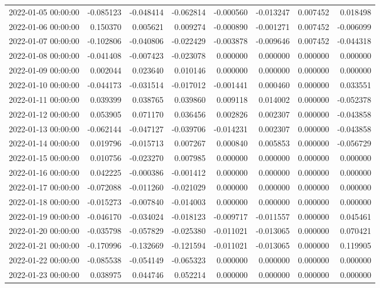 \begin{tabular}{lrrrrrrr}
2022-01-05 00:00:00 & -0.085123 & -0.048414 & -0.062814 & -0.000560 & -0.013247 & 0.007452 & 0.018498 \\
2022-01-06 00:00:00 & 0.150370 & 0.005621 & 0.009274 & -0.000890 & -0.001271 & 0.007452 & -0.006099 \\
2022-01-07 00:00:00 & -0.102806 & -0.040806 & -0.022429 & -0.003878 & -0.009646 & 0.007452 & -0.044318 \\
2022-01-08 00:00:00 & -0.041408 & -0.007423 & -0.023078 & 0.000000 & 0.000000 & 0.000000 & 0.000000 \\
2022-01-09 00:00:00 & 0.002044 & 0.023640 & 0.010146 & 0.000000 & 0.000000 & 0.000000 & 0.000000 \\
2022-01-10 00:00:00 & -0.044173 & -0.031514 & -0.017012 & -0.001441 & 0.000460 & 0.000000 & 0.033551 \\
2022-01-11 00:00:00 & 0.039399 & 0.038765 & 0.039860 & 0.009118 & 0.014002 & 0.000000 & -0.052378 \\
2022-01-12 00:00:00 & 0.053905 & 0.071170 & 0.036456 & 0.002826 & 0.002307 & 0.000000 & -0.043858 \\
2022-01-13 00:00:00 & -0.062144 & -0.047127 & -0.039706 & -0.014231 & 0.002307 & 0.000000 & -0.043858 \\
2022-01-14 00:00:00 & 0.019796 & -0.015713 & 0.007267 & 0.000840 & 0.005853 & 0.000000 & -0.056729 \\
2022-01-15 00:00:00 & 0.010756 & -0.023270 & 0.007985 & 0.000000 & 0.000000 & 0.000000 & 0.000000 \\
2022-01-16 00:00:00 & 0.042225 & -0.000386 & -0.001412 & 0.000000 & 0.000000 & 0.000000 & 0.000000 \\
2022-01-17 00:00:00 & -0.072088 & -0.011260 & -0.021029 & 0.000000 & 0.000000 & 0.000000 & 0.000000 \\
2022-01-18 00:00:00 & -0.015273 & -0.007840 & -0.014003 & 0.000000 & 0.000000 & 0.000000 & 0.000000 \\
2022-01-19 00:00:00 & -0.046170 & -0.034024 & -0.018123 & -0.009717 & -0.011557 & 0.000000 & 0.045461 \\
2022-01-20 00:00:00 & -0.035798 & -0.057829 & -0.025380 & -0.011021 & -0.013065 & 0.000000 & 0.070421 \\
2022-01-21 00:00:00 & -0.170996 & -0.132669 & -0.121594 & -0.011021 & -0.013065 & 0.000000 & 0.119905 \\
2022-01-22 00:00:00 & -0.085538 & -0.054149 & -0.065323 & 0.000000 & 0.000000 & 0.000000 & 0.000000 \\
2022-01-23 00:00:00 & 0.038975 & 0.044746 & 0.052214 & 0.000000 & 0.000000 & 0.000000 & 0.000000 \\

\end{tabular}
